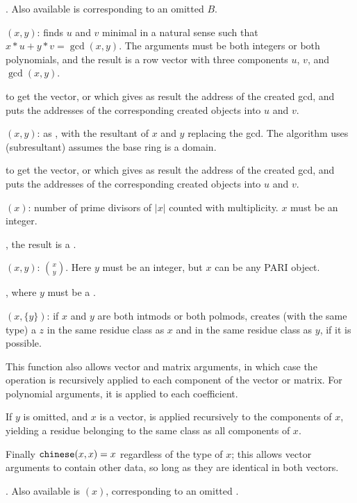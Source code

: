 . Also available is  corresponding
to an omitted $B$.

$(x,y)$: finds $u$ and $v$ minimal in a
natural sense such that $x*u+y*v=\gcd(x,y)$. The arguments
must be both integers or both polynomials, and the result is a
row vector with three components $u$, $v$, and $\gcd(x,y)$.

 to get the vector, or 
which gives as result the address of the created gcd, and puts
the addresses of the corresponding created objects into $u$ and $v$.

$(x,y)$: as , with the resultant of $x$ and
$y$ replacing the gcd.  The algorithm uses
(subresultant) assumes the base ring is a domain.

 to get the vector, or 
which gives as result the address of the created gcd, and puts the
addresses of the corresponding created objects into $u$ and $v$.

$(x)$: number of prime divisors of $|x|$ counted with
multiplicity. $x$ must be an integer.

, the result is a .

$(x,y)$:  $\binom{x}{y}$.
Here $y$ must be an integer, but $x$ can be any PARI object.

, where $y$ must be a .

$(x,\{y\})$: if $x$ and $y$ are both intmods or both
polmods, creates (with the same type) a $z$ in the same residue class
as $x$ and in the same residue class as $y$, if it is possible.

This function also allows vector and matrix arguments, in which case the
operation is recursively applied to each component of the vector or matrix.
For polynomial arguments, it is applied to each coefficient.

If $y$ is omitted, and $x$ is a vector,  is applied recursively
to the components of $x$, yielding a residue belonging to the same class as all
components of $x$.

Finally ${\tt chinese}(x,x) = x$ regardless of the type of $x$; this allows
vector arguments to contain other data, so long as they are identical in both
vectors.

. Also available is $(x)$, corresponding to an
omitted .

